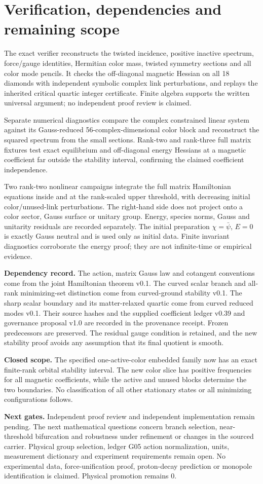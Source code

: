 \documentclass[11pt,a4paper]{article}
\begin{document}
\newpage
\section{Verification, dependencies and remaining scope}
The exact verifier reconstructs the twisted incidence, positive inactive spectrum, force/gauge identities, Hermitian color mass, twisted symmetry sections and all color mode pencils. It checks the off-diagonal magnetic Hessian on all 18 diamonds with independent symbolic complex link perturbations, and replays the inherited critical quartic integer certificate. Finite algebra supports the written universal argument; no independent proof review is claimed.

Separate numerical diagnostics compare the complex constrained linear system against its Gauss-reduced 56-complex-dimensional color block and reconstruct the squared spectrum from the small sections. Rank-two and rank-three full matrix fixtures test exact equilibrium and off-diagonal energy Hessians at a magnetic coefficient far outside the stability interval, confirming the claimed coefficient independence.

Two rank-two nonlinear campaigns integrate the full matrix Hamiltonian equations inside and at the rank-scaled upper threshold, with decreasing initial color/unused-link perturbations. The right-hand side does not project onto a color sector, Gauss surface or unitary group. Energy, species norms, Gauss and unitarity residuals are recorded separately. The initial preparation $\chi=\bar\psi$, $E=0$ is exactly Gauss neutral and is used only as initial data. Finite invariant diagnostics corroborate the energy proof; they are not infinite-time or empirical evidence.

\textbf{Dependency record.} The action, matrix Gauss law and cotangent conventions come from the joint Hamiltonian theorem v0.1. The curved scalar branch and all-rank minimizing-set distinction come from curved-ground stability v0.1. The sharp scalar boundary and its matter-relaxed quartic come from curved reduced modes v0.1. Their source hashes and the supplied coefficient ledger v0.39 and governance proposal v1.0 are recorded in the provenance receipt. Frozen predecessors are preserved. The residual gauge condition is retained, and the new stability proof avoids any assumption that its final quotient is smooth.

\textbf{Closed scope.} The specified one-active-color embedded family now has an exact finite-rank orbital stability interval. The new color slice has positive frequencies for all magnetic coefficients, while the active and unused blocks determine the two boundaries. No classification of all other stationary states or all minimizing configurations follows.

\textbf{Next gates.} Independent proof review and independent implementation remain pending. The next mathematical questions concern branch selection, near-threshold bifurcation and robustness under refinement or changes in the sourced carrier. Physical group selection, ledger G05 action normalization, units, measurement dictionary and experiment requirements remain open. No experimental data, force-unification proof, proton-decay prediction or monopole identification is claimed. Physical promotion remains $0$.
\end{document}

